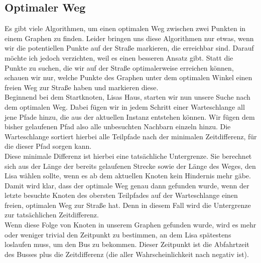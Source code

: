 \documentclass[a4paper,10pt,ngerman]{scrartcl}
\begin{document}
\subsection{Optimaler Weg}
Es gibt viele Algorithmen, um einen optimalen Weg zwischen zwei Punkten in einem Graphen zu finden. Leider bringen uns diese Algorithmen nur etwas, wenn wir die potentiellen Punkte auf der Stra\ss e markieren, die erreichbar sind. Darauf möchte ich jedoch verzichten, weil es einen besseren Ansatz gibt. Statt die Punkte zu suchen, die wir auf der Stra\ss e optimalerweise erreichen können, schauen wir nur, welche Punkte des Graphen unter dem optimalen Winkel einen freien Weg zur Stra\ss e haben und markieren diese.\\
Beginnend bei dem Startknoten, Lisas Haus, starten wir nun unsere Suche nach dem optimalen Weg. Dabei fügen wir in jedem Schritt einer Warteschlange all jene Pfade hinzu, die aus der aktuellen Instanz entstehen können. Wir fügen dem bisher gelaufenen Pfad also alle unbesuchten Nachbarn einzeln hinzu. Die Warteschlange sortiert hierbei alle Teilpfade nach der minimalen Zeitdifferenz, für die dieser Pfad sorgen kann.\\
Diese minimale Differenz ist hierbei eine tatsächliche Untergrenze. Sie berechnet sich aus der Länge der bereits gelaufenen Strecke sowie der Länge des Weges, den Lisa wählen sollte, wenn es ab dem aktuellen Knoten kein Hindernis mehr gäbe. Damit wird klar, dass der optimale Weg genau dann gefunden wurde, wenn der letzte besuchte Knoten des obersten Teilpfades auf der Warteschlange einen freien, optimalen Weg zur Stra\ss e hat. Denn in diesem Fall wird die Untergrenze zur tatsächlichen Zeitdifferenz.\\
Wenn diese Folge von Knoten in unserem Graphen gefunden wurde, wird es mehr oder weniger trivial den Zeitpunkt zu bestimmen, an dem Lisa spätestens loslaufen muss, um den Bus zu bekommen. Dieser Zeitpunkt ist die Abfahrtzeit des Busses plus die Zeitdifferenz (die aller Wahrscheinlichkeit nach negativ ist).
\end{document}
